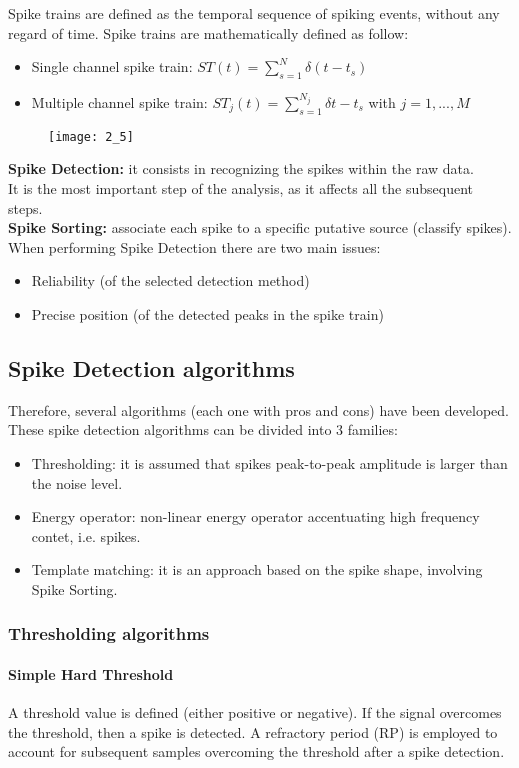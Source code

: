 Spike trains are defined as the temporal sequence of spiking events, without
any regard of time. Spike trains are mathematically defined as follow:
\begin{itemize}
    \item Single channel spike train: \(ST(t)=\sum_{s=1}^{N}\delta{(t-t_s)}\)
    \item Multiple channel spike train: \(ST_j(t)=\sum_{s=1}^{N_j}\delta{t-t_s}\)
    with \(j=1,...,M\)
\end{itemize}
\begin{figure}[H]
    \texttt{[image: 2\_5]}
    \centering
\end{figure}
\textbf{Spike Detection:} it consists in recognizing the spikes within the raw data.\\
It is the most important step of the analysis, as it affects all
the subsequent steps.\\
\textbf{Spike Sorting:} associate each spike to a specific putative source
(classify spikes).\\
When performing Spike Detection there are two main issues:
\begin{itemize}
    \item Reliability (of the selected detection method)
    \item Precise position (of the detected peaks in the spike train)
\end{itemize}


\subsection{Spike Detection algorithms}
Therefore, several algorithms (each one with pros and cons) have been developed.
These spike detection algorithms can be divided into 3 families:
\begin{itemize}
    \item Thresholding: it is assumed that spikes peak-to-peak amplitude is larger
    than the noise level.
    \item Energy operator: non-linear energy operator accentuating high frequency
    contet, i.e. spikes.
    \item Template matching: it is an approach based on the spike shape,
    involving Spike Sorting.
\end{itemize}
\subsubsection{Thresholding algorithms}
\paragraph{Simple Hard Threshold}
A threshold value is defined (either positive or negative). If the signal
overcomes the threshold, then a spike is detected. A refractory period (RP)
is employed to account for subsequent samples overcoming the threshold after
a spike detection.
